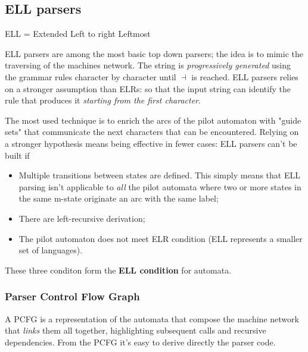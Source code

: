 		\subsection{ELL parsers}
			ELL = Extended Left to right Leftmost

			ELL parsers are among the most basic top down parsers; the idea is to mimic the traversing of the machines network. The string is 
			\emph{progressively generated} using the grammar rules character by character until $\dashv$ is reached. ELL parsers relies on a stronger assumption 
			than ELRs: so that the input string can identify the rule that produces it \emph{starting from the first character}.

			The most used technique is to enrich the arcs of the pilot automaton with "guide sets" that communicate the next characters that can be encountered. 
			Relying on a stronger hypothesis means being effective in fewer cases: ELL parsers can't be built if
			\begin{itemize}
				\item Multiple transitions between states are defined. This simply means that ELL parsing isn't applicable to \emph{all} the pilot automata where 
				two or more states in the same m-state originate an arc with the same label;
				\item There are left-recursive derivation;
				\item The pilot automaton does not meet ELR condition (ELL represents a smaller set of languages). 
			\end{itemize}
			These three conditon form the \textbf{ELL condition} for automata.
			
			\subsubsection{Parser Control Flow Graph}
				A PCFG is a representation of the automata that compose the machine network that \emph{links} them all together, highlighting subsequent calls 
				and recursive dependencies. From the PCFG it's easy to derive directly the parser code.

